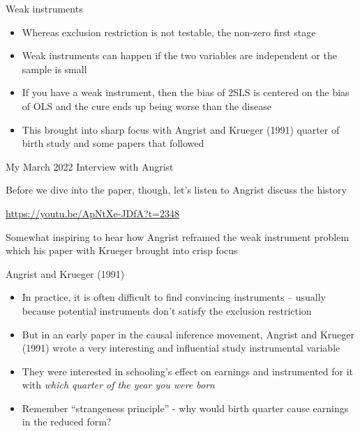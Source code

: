 \documentclass{beamer}
\begin{document}
\begin{frame}{Weak instruments}

\begin{itemize}
\item Whereas exclusion restriction is not testable, the non-zero first stage 
\item Weak instruments can happen if the two variables are independent or the sample is small
\item If you have a weak instrument, then the bias of 2SLS is centered on the bias of OLS and the cure ends up being worse than the disease
\item This brought into sharp focus with Angrist and Krueger (1991) quarter of birth study and some papers that followed
\end{itemize}

\end{frame}

\begin{frame}{My March 2022 Interview with Angrist}

Before we dive into the paper, though, let's listen to Angrist discuss the history

\bigskip

\url{https://youtu.be/ApNtXe-JDfA?t=2348}

\bigskip

Somewhat inspiring to hear how Angrist reframed the weak instrument problem which his paper with Krueger brought into crisp focus

\end{frame}


\begin{frame}{Angrist and Krueger (1991)}
	
	\begin{itemize}
	\item In practice, it is often difficult to find convincing instruments -- usually because potential instruments don't satisfy the exclusion restriction
	\item But in an early paper in the causal inference movement, Angrist and Krueger (1991) wrote a very interesting and influential study instrumental variable 
	\item They were interested in schooling's effect on earnings and instrumented for it with \emph{which quarter of the year you were born}
	\item Remember ``strangeness principle'' - why would birth quarter cause earnings in the reduced form?
	\end{itemize}
	
\end{frame}
\end{document}
